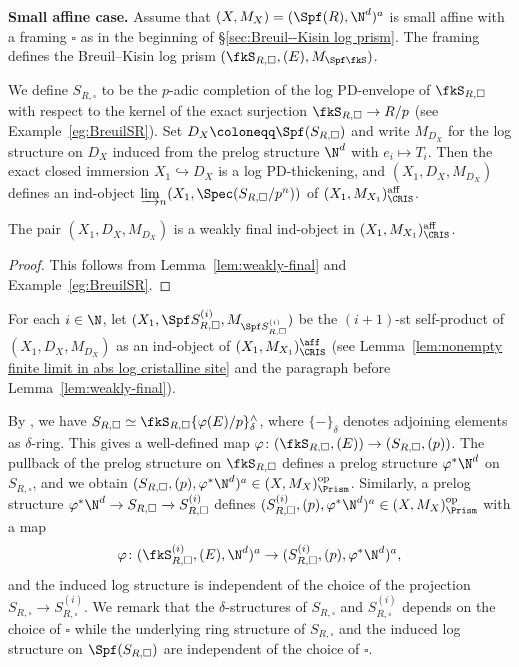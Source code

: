 \smallskip

\noindent
\textbf{Small affine case.} Assume that $(X, M_X)=(\Spf(R),\N^d)^a$ is small affine with a framing 
$\square$ as in the beginning of \S\ref{sec:Breuil--Kisin log prism}.
The framing defines the Breuil--Kisin log prism $(\fkS_{R,\square},(E),M_{\Spf\fkS})$. 

We define $S_{R,\square}$ to be the $p$-adic completion of the log PD-envelope of $\fkS_{R,\square}$ with respect to the kernel of the exact surjection $\fkS_{R,\square} \to R/p$ (see Example~\ref{eg:BreuilSR}). 
Set $D_X \coloneqq \Spf(S_{R,\square})$ and write $M_{D_X}$ for the log structure on $D_X$ induced from the prelog structure $\N^d$ with $e_i \mapsto T_i$. Then the exact closed immersion $X_1\hookrightarrow D_X$ is a log PD-thickening, and $(X_1, D_X, M_{D_X})$ defines an ind-object $\varinjlim_n (X_1,\Spec (S_{R,\square}/p^n))$ of $(X_1,M_{X_1})_{\CRIS}^{\mathrm{aff}}$.

\begin{lem}\label{lem:SRweaklyfinal}
The pair $(X_1,D_X,M_{D_X})$ is a weakly final ind-object in $(X_1,M_{X_1})_{\CRIS}^{\mathrm{aff}}$.
\end{lem}

\begin{proof}
This follows from Lemma~\ref{lem:weakly-final} and Example~\ref{eg:BreuilSR}.
\end{proof}

For each $i\in\N$, let $(X_1,\Spf S_{R,\square}^{(i)},M_{\Spf S_{R,\square}^{(i)}})$ be the $(i+1)$-st self-product of $(X_1, D_X, M_{D_X})$ as an ind-object of $(X_1,M_{X_1})_{\CRIS}^{\aff}$ (see Lemma~\ref{lem:nonempty finite limit in abs log cristalline site} and the paragraph before Lemma~\ref{lem:weakly-final}). 

By \cite[Cor.~2.39]{bhatt-scholze-prismaticcohom}, we have $S_{R, \square} \simeq \fkS_{R,\square}\{\varphi(E)/p\}_\delta^\wedge$, where $\{-\}_\delta$ denotes adjoining elements as $\delta$-ring. This gives a well-defined map $\varphi\colon(\fkS_{R,\square},(E)) \to (S_{R, \square},(p))$. The pullback of the prelog structure on $\fkS_{R,\square}$ defines a prelog structure $\varphi^\ast\N^d$ on $S_{R, \square}$, and we obtain $(S_{R, \square},(p),\varphi^\ast \N^d)^a \in (X,M_X)_\Prism^\mathrm{op}$. Similarly, a prelog structure $\varphi^\ast \N^d\rightarrow S_{R,\square}\xrightarrow{} S_{R,\square}^{(i)}$ defines $(S_{R,\square}^{(i)},(p), \varphi^\ast \N^d)^a\in (X,M_X)_\Prism^\mathrm{op}$ with a map 
\[
\varphi\colon (\fkS_{R,\square}^{(i)},(E), \N^d)^a\rightarrow(S_{R,\square}^{(i)},(p), \varphi^\ast \N^d)^a, 
\]
and the induced log structure is independent of the choice of the projection $S_{R,\square}\xrightarrow{} S_{R,\square}^{(i)}$. We remark that the $\delta$-structures of $S_{R,\square}$ and $S_{R,\square}^{(i)}$ depends on the choice of $\square$ while the underlying ring structure of $S_{R,\square}$ and the induced log structure on $\Spf (S_{R,\square})$ are independent of the choice of $\square$. 

